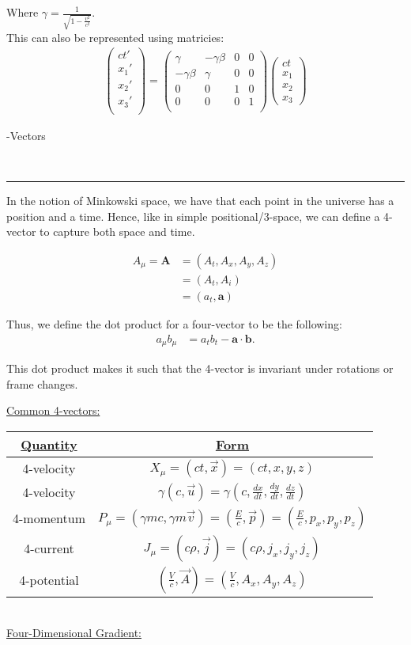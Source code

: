 \documentclass{article}
\newcommand{\header}[1]{\begin{large}\noindent #1\end{large}\\\rule{\textwidth}{0.5pt}}
\newcommand{\sheader}[1]{\underline{#1:}}
\newcommand{\gap}{\medskip\\}
\newcommand{\ds}{\displaystyle}
\begin{document}
Where $\ds \gamma = \frac{1}{\sqrt{1 - \frac{v^2}{c^2}}}$.
\gap
This can also be represented using matricies:
\begin{align*}
    \begin{pmatrix}
        ct'\\
        x_1'\\
        x_2'\\
        x_3'\\
    \end{pmatrix}
    = \begin{pmatrix}
        \gamma & - \gamma \beta & 0 & 0\\
        -\gamma \beta & \gamma & 0 & 0\\
        0 & 0 & 1 & 0\\
        0 & 0 & 0 & 1\\
    \end{pmatrix}\begin{pmatrix}
        ct\\x_1\\x_2\\x_3
    \end{pmatrix}
\end{align*}
\header{4-Vectors}
In the notion of Minkowski space, we have that each point in the 
universe has a position and a time. Hence, like in simple positional/3-space,
we can define a 4-vector to capture both space and time.

\begin{align*}
    A_\mu = \mathbf{A} &= (A_t, A_x, A_y, A_z)\\
    &= (A_t, A_i)\\
    &= (a_t, \mathbf{a})
\end{align*}

Thus, we define the dot product for a four-vector to be the following:
\begin{align*}
    a_\mu b_\mu &= a_tb_t - \mathbf{a} \cdot \mathbf{b}.
\end{align*}

This dot product makes it such that the 4-vector is invariant under 
rotations or frame changes.

\sheader{Common 4-vectors}

\renewcommand{\arraystretch}{1.5}
\begin{tabular}{|c|c|}
    \hline
    \underline{Quantity} & \underline{Form} \\
    \hline
    4-velocity & $\ds X_\mu = (ct, \vec{x}) = (ct, x, y, z)$ \\
    \hline
    4-velocity & $\ds \gamma(c, \vec{u}) = \gamma\left(c, \frac{dx}{dt}, \frac{dy}{dt}, \frac{dz}{dt}\right)$ \\
    \hline
    4-momentum & $\ds P_\mu = (\gamma m c, \gamma m \vec{v}) = \left(\frac{E}{c}, \vec{p}\right) = \left(\frac{E}{c}, p_x, p_y, p_z\right)$\\
    \hline
    4-current & $\ds J_\mu = (c\rho, \vec{j}) = (c\rho, j_x, j_y, j_z)$ \\
    \hline
    4-potential & $\ds \left(\frac{V}{c}, \vec{A}\right) = \left(\frac{V}{c}, A_x, A_y, A_z\right)$\\
    \hline
\end{tabular}
\gap
\sheader{Four-Dimensional Gradient}
\end{document}
